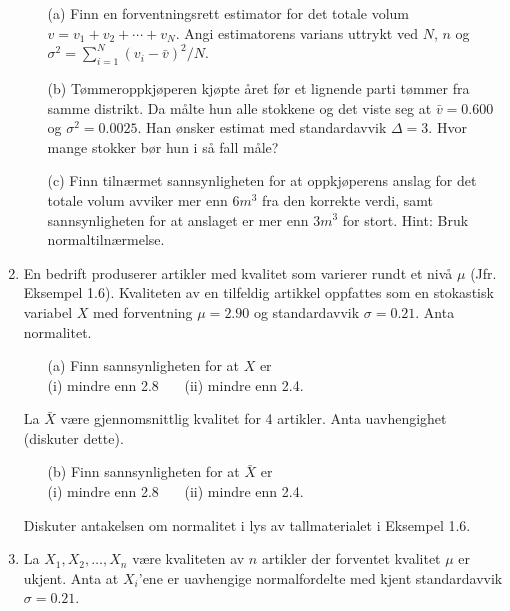 \begin{enumerate}
\begin{itemize}
  \item[(a)]  Finn en forventningsrett estimator for det totale volum\\
                $v=v_1 +v_2+\cdots + v_N$. Angi estimatorens
               varians uttrykt ved $N$, $n$ og $\sigma ^2=\sum_{i=1}^N(v_i -
               \bar{v})^2/N$.
  \item[(b)]  Tømmeroppkjøperen kjøpte året før
               et lignende parti tømmer fra samme distrikt. Da
               målte hun alle stokkene og det viste seg at
               $\bar{v}=0.600$ og $\sigma ^2=0.0025$. Han
               ønsker estimat med standardavvik $\Delta =3$.
               Hvor mange stokker bør hun i så fall
               måle?
  \item[(c)]  Finn tilnærmet sannsynligheten for at
               oppkjøperens anslag for det totale volum
               avviker mer enn $6m^3$ fra den korrekte verdi,
               samt sannsynligheten for at anslaget er mer enn
               $3m^3$ for stort. Hint: Bruk
               normaltilnærmelse.
 \end{itemize}
\item     En bedrift produserer artikler med kvalitet som
          varierer rundt et nivå $\mu$ (Jfr. Eksempel 1.6).
          Kvaliteten av en tilfeldig artikkel oppfattes som en
          stokastisk variabel $X$ med forventning $\mu=2.90$ og
          standardavvik $\sigma=0.21$. Anta normalitet.
 \begin{itemize}
  \item[(a)]  Finn sannsynligheten for at $X$ er \\
                  (i) mindre enn 2.8 \ \ \ (ii) mindre enn 2.4.
 \end{itemize}
    La $\bar X$ være gjennomsnittlig kvalitet for
               4 artikler. Anta uavhengighet (diskuter dette).
 \begin{itemize}
  \item[(b)]  Finn sannsynligheten for at $\bar X$ er \\
                  (i) mindre enn 2.8 \ \ \ (ii) mindre enn 2.4.
 \end{itemize}
               Diskuter antakelsen om normalitet i lys av
               tallmaterialet i Eksempel 1.6.
\item     La $X_1,X_2,\ldots ,X_n$ være kvaliteten av $n$
          artikler der forventet kvalitet $\mu$ er ukjent. Anta
          at $X_i$'ene er uavhengige normalfordelte med kjent
          standardavvik $\sigma=0.21$.
 \begin{itemize}

\end{itemize}
\end{enumerate}
